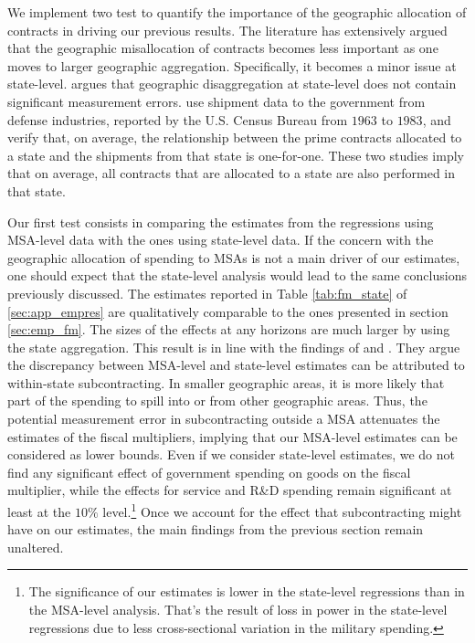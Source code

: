 \documentclass[dv_diss_main.tex]{subfiles}
\begin{document}
We implement two test to quantify the importance of the geographic allocation of contracts in driving our previous results. The literature has extensively argued that the geographic misallocation of contracts becomes less important as one moves to larger geographic aggregation. Specifically, it becomes a minor issue at state-level. \cite{Isard1962} argues that geographic disaggregation at state-level does not contain significant measurement errors. \cite{Nakamura2014} use shipment data to the government from defense industries, reported by the U.S. Census Bureau from $1963$ to $1983$, and verify that, on average, the relationship between the prime contracts allocated to a state and the shipments from that state is one-for-one. These two studies imply that on average, all contracts that are allocated to a state are also performed in that state.

Our first test consists in comparing the estimates from the regressions using MSA-level data with the ones using state-level data. If the concern with the geographic allocation of spending to MSAs is not a main driver of our estimates, one should expect that the state-level analysis would lead to the same conclusions previously discussed. The estimates reported in Table \ref{tab:fm_state} of \ref{sec:app_empres} are qualitatively comparable to the ones presented in section \ref{sec:emp_fm}. The sizes of the effects at any horizons are much larger by using the state aggregation. This result is in line with the findings of \cite{Demyanyk2019} and \cite{Auerbach2020}. They argue the discrepancy between MSA-level and state-level estimates can be attributed to within-state subcontracting. In smaller geographic areas, it is more likely that part of the spending to spill into or from other geographic areas. Thus, the potential measurement error in subcontracting outside a MSA attenuates the estimates of the fiscal multipliers, implying that our MSA-level estimates can be considered as lower bounds. Even if we consider state-level estimates, we do not find any significant effect of government spending on goods on the fiscal multiplier, while the effects for service and R\&D spending remain significant at least at the $10\%$ level.\footnote{The significance of our estimates is lower in the state-level regressions than in the MSA-level analysis. That's the result of loss in power in the state-level regressions due to less cross-sectional variation in the military spending.} Once we account for the effect that subcontracting might have on our estimates, the main findings from the previous section remain unaltered.
\end{document}
